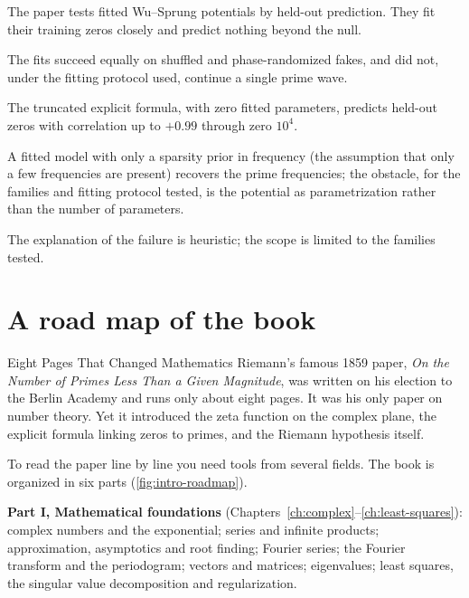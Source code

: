 \begin{keyideas}
\item The paper tests fitted Wu--Sprung potentials by held-out prediction. They fit their training zeros closely and predict nothing beyond the null.
\item The fits succeed equally on shuffled and phase-randomized fakes, and did not, under the fitting protocol used, continue a single prime wave.
\item The truncated explicit formula, with zero fitted parameters, predicts held-out zeros with correlation up to $+0.99$ through zero $10^4$.
\item A fitted model with only a sparsity prior in frequency (the assumption that only a few frequencies are present) recovers the prime frequencies; the obstacle, for the families and fitting protocol tested, is the potential as parametrization rather than the number of parameters.
\item The explanation of the failure is heuristic; the scope is limited to the families tested.
\end{keyideas}

\section{A road map of the book}\label{sec:intro-roadmap}
\begin{didyouknow}{Eight Pages That Changed Mathematics}
Riemann's famous 1859 paper, \emph{On the Number of Primes Less Than a Given Magnitude}, was written on his election to the Berlin Academy and runs only about eight pages. It was his only paper on number theory. Yet it introduced the zeta function on the complex plane, the explicit formula linking zeros to primes, and the Riemann hypothesis itself.
\end{didyouknow}

To read the paper line by line you need tools from several fields. The book is organized in six parts (\cref{fig:intro-roadmap}).

\textbf{Part I, Mathematical foundations} (Chapters~\ref{ch:complex}--\ref{ch:least-squares}): complex numbers and the exponential; series and infinite products; approximation, asymptotics and root finding; Fourier series; the Fourier transform and the periodogram; vectors and matrices; eigenvalues; least squares, the singular value decomposition and regularization.


